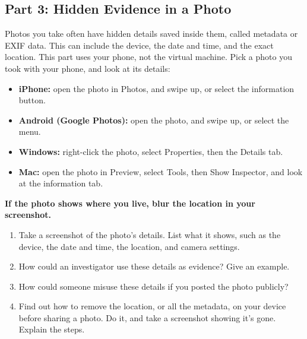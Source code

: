 \documentclass[12pt]{article}
\begin{document}
\subsection*{Part 3: Hidden Evidence in a Photo}
Photos you take often have hidden details saved inside them, called metadata or EXIF data. This can include the device, the date and time, and the exact location. This part uses your phone, not the virtual machine. Pick a photo you took with your phone, and look at its details:
\begin{itemize}
    \item \textbf{iPhone:} open the photo in Photos, and swipe up, or select the information button.
    \item \textbf{Android (Google Photos):} open the photo, and swipe up, or select the menu.
    \item \textbf{Windows:} right-click the photo, select Properties, then the Details tab.
    \item \textbf{Mac:} open the photo in Preview, select Tools, then Show Inspector, and look at the information tab.
\end{itemize}
\textbf{If the photo shows where you live, blur the location in your screenshot.}
\begin{enumerate}[start=10]
    \item Take a screenshot of the photo's details. List what it shows, such as the device, the date and time, the location, and camera settings.
    \item How could an investigator use these details as evidence? Give an example.
    \item How could someone misuse these details if you posted the photo publicly?
    \item Find out how to remove the location, or all the metadata, on your device before sharing a photo. Do it, and take a screenshot showing it's gone. Explain the steps.
\end{enumerate}
\end{document}
